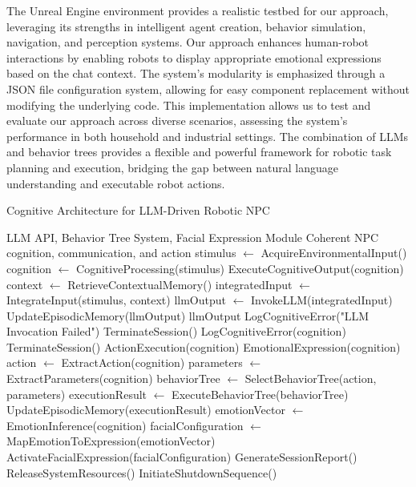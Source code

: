 \documentclass[pdflatex,sn-mathphys-num]{sn-jnl}%
\theoremstyle{thmstyleone}
\theoremstyle{thmstyletwo}%
\theoremstyle{thmstylethree}%
\begin{document}
The Unreal Engine environment provides a realistic testbed for our approach, leveraging its strengths in intelligent agent creation, behavior simulation, navigation, and perception systems.
Our approach enhances human-robot interactions by enabling robots to display appropriate emotional expressions based on the chat context. The system's modularity is emphasized through a JSON file configuration system, allowing for easy component replacement without modifying the underlying code.
This implementation allows us to test and evaluate our approach across diverse scenarios, assessing the system's performance in both household and industrial settings. The combination of LLMs and behavior trees provides a flexible and powerful framework for robotic task planning and execution, bridging the gap between natural language understanding and executable robot actions.
\begin{algorithm}
    \caption{Cognitive Architecture for LLM-Driven Robotic NPC}\label{algo_cognitive_npc}
    \begin{algorithmic}[1]
    \Require LLM API, Behavior Tree System, Facial Expression Module
    \Ensure Coherent NPC cognition, communication, and action
    \State stimulus $\gets$ AcquireEnvironmentalInput()
    \State cognition $\gets$ CognitiveProcessing(stimulus)
    \State ExecuteCognitiveOutput(cognition)
    \EndWhile
    \EndProcedure
    \State context $\gets$ RetrieveContextualMemory()
    \State integratedInput $\gets$ IntegrateInput(stimulus, context)
    \State llmOutput $\gets$ InvokeLLM(integratedInput)
    \State UpdateEpisodicMemory(llmOutput)
    \State \Return llmOutput
    \Else
    \State LogCognitiveError("LLM Invocation Failed")
    \State TerminateSession()
    \EndIf
    \EndProcedure
    \State LogCognitiveError(cognition)
    \State TerminateSession()
    \Else
    \ParallelProcedure
    \State ActionExecution(cognition)
    \State EmotionalExpression(cognition)
    \EndParallelProcedure
    \EndIf
    \EndProcedure
    \State action $\gets$ ExtractAction(cognition)
    \State parameters $\gets$ ExtractParameters(cognition)
    \State behaviorTree $\gets$ SelectBehaviorTree(action, parameters)
    \State executionResult $\gets$ ExecuteBehaviorTree(behaviorTree)
    \State UpdateEpisodicMemory(executionResult)
    \EndProcedure
    \State emotionVector $\gets$ EmotionInference(cognition)
    \State facialConfiguration $\gets$ MapEmotionToExpression(emotionVector)
    \State ActivateFacialExpression(facialConfiguration)
    \EndProcedure
    \State GenerateSessionReport()
    \State ReleaseSystemResources()
    \State InitiateShutdownSequence()
    \EndProcedure
    \end{algorithmic}
    \end{algorithm}
\end{document}
